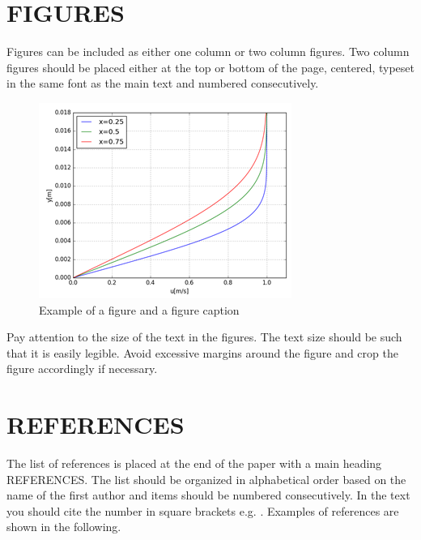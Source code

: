 \documentclass{cfm_paper} %
\begin{document}
\section*{FIGURES}
Figures can be included as either one column or two column figures. Two column figures should be placed either at the top or bottom of the page, centered, typeset in the same font as the main text and numbered consecutively.

\begin{figure}
    \includegraphics[width = \columnwidth]{cfm_test.png}
    \caption{Example of a figure and a figure caption} %
    \label{fig:ExampleFigure}
\end{figure}

Pay attention to the size of the text in the figures. The text size should be such that it is easily legible. Avoid excessive margins around the figure and crop the figure accordingly if necessary.

\section*{REFERENCES}
The list of references is placed at the end of the paper with a main heading REFERENCES. The list should be organized in alphabetical order based on the name of the first author and items should be numbered consecutively. In the text you should cite the number in square brackets e.g. \cite{Hanninen2016, Tu2012}. %
Examples of references are shown in the following.

\printbibliography[title={REFERENCES}] %
\end{document}
